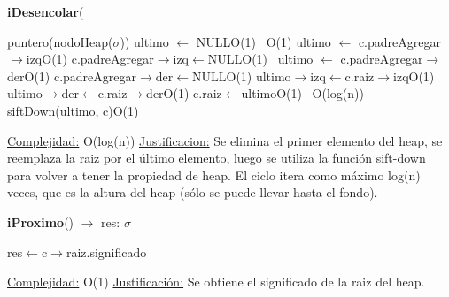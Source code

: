 \begin{Representacion}
\begin{Algoritmos}
\begin{algorithm}[H]{\textbf{iDesencolar}(}
\begin{algorithmic}[1]
		\State puntero(nodoHeap($\sigma$)) ultimo $\leftarrow$ NULL\Comment O(1)
		\,
		\Comment O(1)
			\State ultimo $\leftarrow$ c.padreAgregar$\rightarrow$izq\Comment O(1)
			\State c.padreAgregar$\rightarrow$izq$\leftarrow$NULL\Comment O(1)
			\,
		\Else
			\State ultimo $\leftarrow$ c.padreAgregar$\rightarrow$der\Comment O(1)
			\State c.padreAgregar$\rightarrow$der$\leftarrow$NULL\Comment O(1)
		\EndIf
		\State ultimo$\rightarrow$izq$\leftarrow$c.raiz$\rightarrow$izq\Comment O(1)
		\State ultimo$\rightarrow$der$\leftarrow$c.raiz$\rightarrow$der\Comment O(1)
		\State c.raiz$\leftarrow$ultimo\Comment O(1)
		\,
		 \Comment O(log(n))
			\State siftDown(ultimo, c)\Comment O(1)
		\EndWhile
		
		\medskip
		\Statex \underline{Complejidad:} O(log(n))
			\Statex \underline{Justificacion:} Se elimina el primer elemento del heap, se reemplaza la raiz por el último elemento, luego se utiliza la función sift-down para volver a tener la propiedad de heap. El ciclo itera como máximo log(n) veces, que es la altura del heap (sólo se puede llevar hasta el fondo).  
	\end{algorithmic}
\end{algorithm}


\begin{algorithm}[H]{\textbf{iProximo}() $\to$ res: $\sigma$}
	\begin{algorithmic}[1]
		
		\State res$\leftarrow$c$\rightarrow$raiz.significado
		
		\medskip
		\Statex \underline{Complejidad:} O(1)
			\Statex \underline{Justificación:} Se obtiene el significado de la raiz del heap.
	\end{algorithmic}
\end{algorithm}



\end{Algoritmos}
\end{Representacion}
